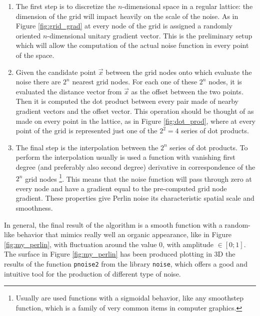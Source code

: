 \begin{enumerate}
    \item The first step is to discretize the $n$-dimensional space in a regular lattice: the dimension of the grid will impact heavily on the scale of the noise. As in Figure \ref{fig:grid_grad} at every node of the grid is assigned a randomly oriented $n$-dimensional unitary gradient vector. This is the preliminary setup which will allow the computation of the actual noise function in every point of the space.

    \item Given the candidate point $\vec x$ between the grid nodes onto which evaluate the noise there are $2^n$ nearest grid nodes. For each one of these $2^n$ nodes, it is evaluated the distance vector from $\vec x$ as the offset between the two points. Then it is computed the dot product between every pair made of nearby gradient vectors and the offset vector. This operation should be thought of as made on every point in the lattice, as in Figure \ref{fig:dot_prod}, where at every point of the grid is represented just one of the $2^2 = 4$ series of dot products.

    \item The final step is the interpolation between the $2^n$ series of dot products. To perform the interpolation usually is used a function with vanishing first degree (and preferably also second degree) derivative in correspondence of the $2^n$ grid nodes \footnote{Usually are used functions with a sigmoidal behavior, like any smoothstep function, which is a family of very common items in computer graphics.}. This means that the noise function will pass through zero at every node and have a gradient equal to the pre-computed grid node gradient. These properties give Perlin noise its characteristic spatial scale and smoothness.
\end{enumerate}

In general, the final result of the algorithm is a smooth function with a random-like behavior that mimics really well an organic appearance, like in Figure \ref{fig:my_perlin}, with fluctuation around the value 0, with amplitude $ \in [ 0;1] $. The surface in Figure \ref{fig:my_perlin} has been produced plotting in 3D the results of the function \texttt{pnoise2} from the library \texttt{noise}, which offers a good and intuitive tool for the production of different type of noise.

